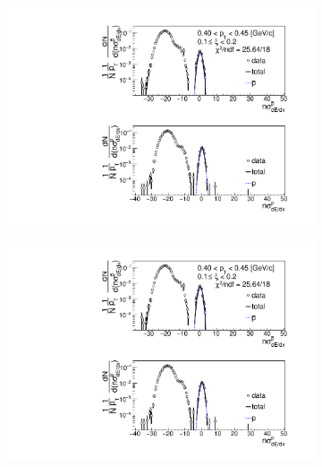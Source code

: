 \begin{figure}[h!]
\begin{subfigure}{.32\textwidth}
	\end{subfigure}
	\begin{subfigure}{.32\textwidth}
		\includegraphics[width=\linewidth, page=9]{chapters/chrgSTAR/img/dEdx/fit2019_thirdStep_2_2.pdf}
	\end{subfigure}
	\begin{subfigure}{.32\textwidth}
		\includegraphics[width=\linewidth, page=10]{chapters/chrgSTAR/img/dEdx/fit2019_thirdStep_2_2.pdf}
	\end{subfigure}
	\begin{subfigure}{.32\textwidth}

\end{subfigure}
\end{figure}
